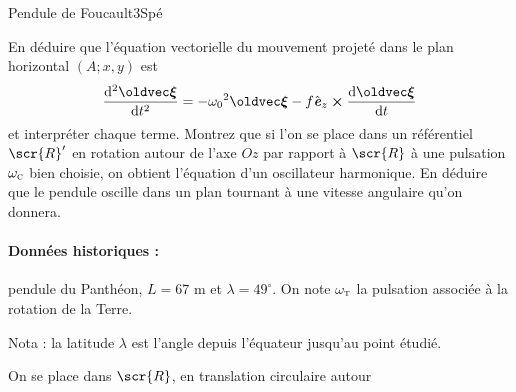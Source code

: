 \begin{exercise}{Pendule de Foucault}{3}{Spé}
\begin{questions}
    \question En déduire que l’équation vectorielle du mouvement projeté dans le plan horizontal $(A ; x, y)$ est
    $$\dv[2]{\vec{\xi}}{t} = -{\omega_0}^2\vec{\xi} - f \ve_z\cross\dv{\vec{\xi}}{t}$$
    et interpréter chaque terme.
    \question Montrez que si l'on se place dans un référentiel $\scr{R}'$ en rotation autour de l'axe $Oz$ par rapport à $\scr{R}$ à une pulsation $\omega_\textsc{c}$ bien choisie, on obtient l'équation d'un oscillateur harmonique.
    En déduire que le pendule oscille dans un plan tournant à une vitesse angulaire qu'on donnera.
\end{questions}
\paragraph{Données historiques :} pendule du Panthéon, $L = 67$ m et $\lambda = 49^\circ$.
On note $\omega_\textsc{t}$ la pulsation associée à la rotation de la Terre.

\noindent\textsf{Nota :} la latitude $\lambda$ est l'angle depuis l'équateur jusqu'au point étudié.
\end{exercise}


\begin{solution}

\begin{questions}
    \setcounter{question}{2}
    \question On se place dans $\scr{R}$, en translation circulaire autour
\end{questions}

\end{solution}